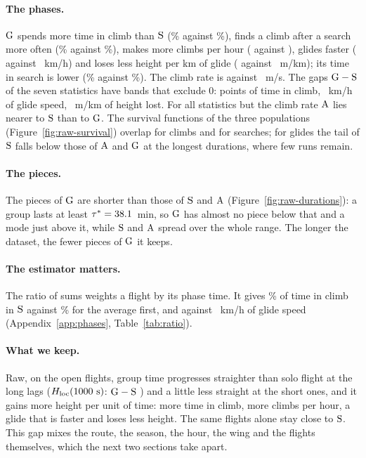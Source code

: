 \paragraph{The phases.} $\mathrm{G}$ spends more time in climb than $\mathrm{S}$ (\RawStatClimbG\% against \RawStatClimbS\%), finds a climb after a search more often
(\RawStatFoundG\% against \RawStatFoundS\%), makes more climbs per hour (\RawStatCphG{} against \RawStatCphS), glides faster (\RawStatGlideG{} against \RawStatGlideS~km/h) and loses
less height per km of glide (\RawStatSinkG{} against \RawStatSinkS~m/km); its time in search is lower (\RawStatSearchG\% against \RawStatSearchS\%). The climb rate is \RawStatRateG{} against \RawStatRateS~m/s.
The gaps $\mathrm{G}-\mathrm{S}$ of the seven statistics have bands that exclude 0: \RawGapClimb{} \RawGapClimbBand{} points of time in climb, \RawGapGlide{} \RawGapGlideBand~km/h of glide speed, \RawGapSink{} \RawGapSinkBand~m/km of height lost.
For all statistics but the climb rate $\mathrm{A}$ lies nearer to $\mathrm{S}$ than to $\mathrm{G}$. The survival functions
of the three populations (Figure~\ref{fig:raw-survival}) overlap for climbs and for searches; for glides the tail of $\mathrm{S}$ falls below those of $\mathrm{A}$ and $\mathrm{G}$ at the longest durations, where few runs remain.

\paragraph{The pieces.} The pieces of $\mathrm{G}$ are shorter than those of $\mathrm{S}$ and $\mathrm{A}$ (Figure~\ref{fig:raw-durations}): a group lasts at least $\tau^*=38.1$~min, so $\mathrm{G}$ has almost no piece below that and a mode just above it,
while $\mathrm{S}$ and $\mathrm{A}$ spread over the whole range. The longer the dataset, the fewer pieces of $\mathrm{G}$ it keeps.

\paragraph{The estimator matters.} The ratio of sums weights a flight by its phase time. It gives \RawSumClimbS\% of time in climb in $\mathrm{S}$ against \RawStatClimbS\% for the average first,
and \RawSumGlideS{} against \RawStatGlideS~km/h of glide speed (Appendix~\ref{app:phases}, Table~\ref{tab:ratio}).

\paragraph{What we keep.} Raw, on the open flights, group time progresses straighter than solo flight at the long lags ($H_\mathrm{loc}(1000~\mathrm{s})$: $\mathrm{G}-\mathrm{S}$ \RawGapHK{} \RawGapHKBand) and a little less straight at the short ones, and it gains more height per unit of time:
more time in climb, more climbs per hour, a glide that is faster and loses less height. The same flights alone stay close to $\mathrm{S}$. This gap
mixes the route, the season, the hour, the wing and the flights themselves, which the next two sections take apart.
